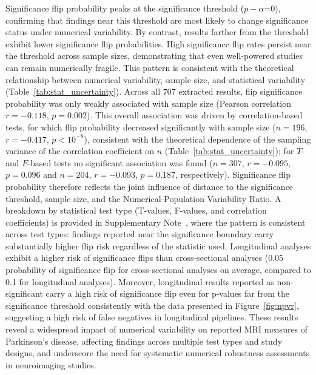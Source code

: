 Significance flip probability peaks at the significance threshold
($p-\alpha$=0), confirming that findings near this threshold are most likely to
change significance status under numerical variability. By contrast, results
farther from the threshold exhibit lower significance flip probabilities. High
significance flip rates persist near the threshold across sample sizes,
demonstrating that even well-powered studies can remain numerically fragile.
This pattern is consistent with the theoretical relationship between numerical
variability, sample size, and statistical variability
(Table~\ref{tab:stat_uncertainty}). Across all 707 extracted results, flip
significance probability was only weakly associated with sample size (Pearson
correlation $r=-0.118$, $p=0.002$). This overall association was driven by
correlation-based tests, for which flip probability decreased significantly with
sample size ($n=196$, $r=-0.417$, $p<10^{-8}$), consistent with the theoretical
dependence of the sampling variance of the correlation coefficient on $n$
(Table~\ref{tab:stat_uncertainty}); for $T$- and $F$-based tests no significant
association was found ($n=307$, $r=-0.095$, $p=0.096$ and $n=204$, $r=-0.093$,
$p=0.187$, respectively). Significance flip probability therefore reflects the
joint influence of distance to the significance threshold, sample size, and the
Numerical-Population Variability Ratio. A breakdown by statistical test type
(T-values, F-values, and correlation coefficients) is provided in Supplementary
Note~, where
the pattern is consistent across test types: findings reported near the
significance boundary carry substantially higher flip risk regardless of the
statistic used. Longitudinal analyses exhibit a higher risk of significance
flips than cross-sectional analyses (0.05 probability of significance flip for
cross-sectional analyses on average, compared to 0.1 for longitudinal analyses).
Moreover, longitudinal results reported as non-significant carry a high risk of
significance flip even for p-values far from the significance threshold
consistently with the data presented in Figure~\ref{fig:npvr}, suggesting a high
risk of false negatives in longitudinal pipelines. These results reveal a
widespread impact of numerical variability on reported MRI measures of
Parkinson's disease, affecting findings across multiple test types and study
designs, and underscore the need for systematic numerical robustness assessments
in neuroimaging studies.

